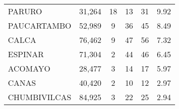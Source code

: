 \begin{tabular}{lrcclr}
	\cellcolor[HTML]{C6E0B4}PARURO                                 & 31,264                                                         & 18                                                         & 13                   & 31                                                                  & 9.92                                                                         \\
	\cellcolor[HTML]{C6E0B4}PAUCARTAMBO                            & 52,989                                                         & 9                                                          & 36                   & 45                                                                  & 8.49                                                                         \\
	\cellcolor[HTML]{C6E0B4}CALCA                                  & 76,462                                                         & 9                                                          & 47                   & 56                                                                  & 7.32                                                                         \\
	\cellcolor[HTML]{C6E0B4}ESPINAR                                & 71,304                                                         & 2                                                          & 44                   & 46                                                                  & 6.45                                                                         \\
	\cellcolor[HTML]{C6E0B4}ACOMAYO                                & 28,477                                                         & 3                                                          & 14                   & 17                                                                  & 5.97                                                                         \\
	\cellcolor[HTML]{C6E0B4}CANAS                                  & 40,420                                                         & 2                                                          & 10                   & 12                                                                  & 2.97                                                                         \\
	\cellcolor[HTML]{C6E0B4}CHUMBIVILCAS                           & 84,925                                                         & 3                                                          & 22                   & 25                                                                  & 2.94                                                                         \\

\end{tabular}
